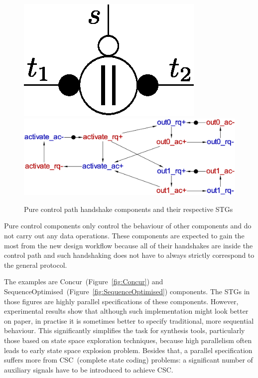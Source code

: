 \begin{figure}
{\begin{centering}
\includegraphics[scale=0.6]{figures/Control/concur-HC}~~\includegraphics[scale=0.25]{figures/Control/concur}
\par\end{centering}

}

\caption{Pure control path handshake components and their respective STGs}
\end{figure}


Pure control components only control the behaviour of other components
and do not carry out any data operations. These components are expected
to gain the most from the new design workflow because all of their
handshakes are inside the control path and such handshaking does not
have to always strictly correspond to the general protocol.

The examples are Concur~(Figure~\ref{fig:Concur}) and SequenceOptimised~(Figure~\ref{fig:SequenceOptimised})
components. The STGs in those figures are highly parallel specifications
of these components. However, experimental results show that although
such implementation might look better on paper, in practise it is
sometimes better to specify traditional, more sequential behaviour.
This significantly simplifies the task for synthesis tools, particularly
those based on state space exploration techniques, because high parallelism
often leads to early state space explosion problem. Besides that,
a parallel specification suffers more from CSC~(complete state coding)
problems: a significant number of auxiliary signals have to be introduced
to achieve CSC.


